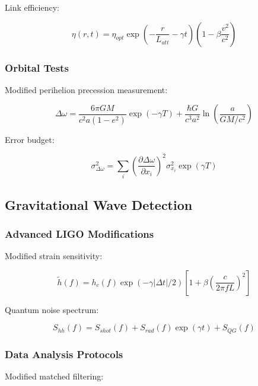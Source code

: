 \documentclass[12pt]{article}
\theoremstyle{plain}
\theoremstyle{definition}
\theoremstyle{remark}
\begin{document}
Link efficiency:

\begin{equation}
\eta(r,t) = \eta_{opt}\exp\left(-\frac{r}{L_{att}} - \gamma t\right)\left(1 - \beta\frac{v^2}{c^2}\right)
\end{equation}

\subsubsection{Orbital Tests}

Modified perihelion precession measurement:

\begin{equation}
\Delta\omega = \frac{6\pi GM}{c^2a(1-e^2)}\exp(-\gamma T) + \frac{\hbar G}{c^3a^2}\ln\left(\frac{a}{GM/c^2}\right)
\end{equation}

Error budget:

\begin{equation}
\sigma_{\Delta\omega}^2 = \sum_i \left(\frac{\partial\Delta\omega}{\partial x_i}\right)^2\sigma_{x_i}^2\exp(\gamma T)
\end{equation}

\subsection{Gravitational Wave Detection}

\subsubsection{Advanced LIGO Modifications}

Modified strain sensitivity:

\begin{equation}
\tilde{h}(f) = h_c(f)\exp(-\gamma|\Delta t|/2)\left[1 + \beta\left(\frac{c}{2\pi fL}\right)^2\right]
\end{equation}

Quantum noise spectrum:

\begin{equation}
S_{hh}(f) = S_{shot}(f) + S_{rad}(f)\exp(\gamma t) + S_{QG}(f)
\end{equation}

\subsubsection{Data Analysis Protocols}

Modified matched filtering:
\end{document}
